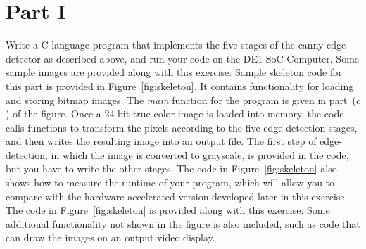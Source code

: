 \documentclass[epsfig,10pt,fullpage]{article}
\begin{document}
\section*{Part I}

Write a C-language program that implements the five stages of the canny edge detector as described
above, and run your code on the DE1-SoC Computer. Some sample images are provided along
with this exercise. Sample skeleton code for this part is provided in Figure~\ref{fig:skeleton}. 
It contains functionality for loading and storing bitmap images. The {\it main} function for 
the program is given in part~($c$) of the figure. Once a 24-bit true-color image is loaded 
into memory, the code calls functions to transform the pixels according to the five 
edge-detection stages, and then writes the resulting image into an output file. The first 
step of edge-detection, in which the image is converted to grayscale, is provided in the code,
but you have to write the other stages.  The code in Figure~\ref{fig:skeleton} also 
shows how to measure the runtime of your program, which will allow you to compare with the 
hardware-accelerated version developed later in this exercise. The code in 
Figure~\ref{fig:skeleton} is provided along with this exercise. Some additional functionality not
shown in the figure is also included, such as code that can draw the images on an
output video display.
\end{document}
